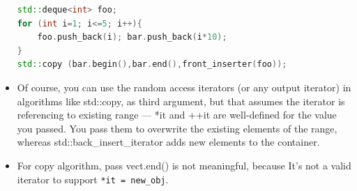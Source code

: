 \documentclass[a4paper,11pt,twoside]{book}
\begin{document}
\begin{itemize}
\begin{lstlisting}[frame=single, language=c++]
  std::deque<int> foo;
for (int i=1; i<=5; i++){ 
	foo.push_back(i); bar.push_back(i*10); 
}
std::copy (bar.begin(),bar.end(),front_inserter(foo));
\end{lstlisting}

\item Of course, you can use the random access iterators (or any output iterator) in algorithms like std::copy, as third argument, but that assumes the iterator is referencing to existing range — *it and ++it are well-defined for the value you passed. You pass them to overwrite the existing elements of the range, whereas std::back\_insert\_iterator adds new elements to the container.

\item For copy algorithm, pass vect.end() is not meaningful, because It's not a valid iterator to support \texttt{*it = new\_obj}.

\end{itemize}
\end{document}
